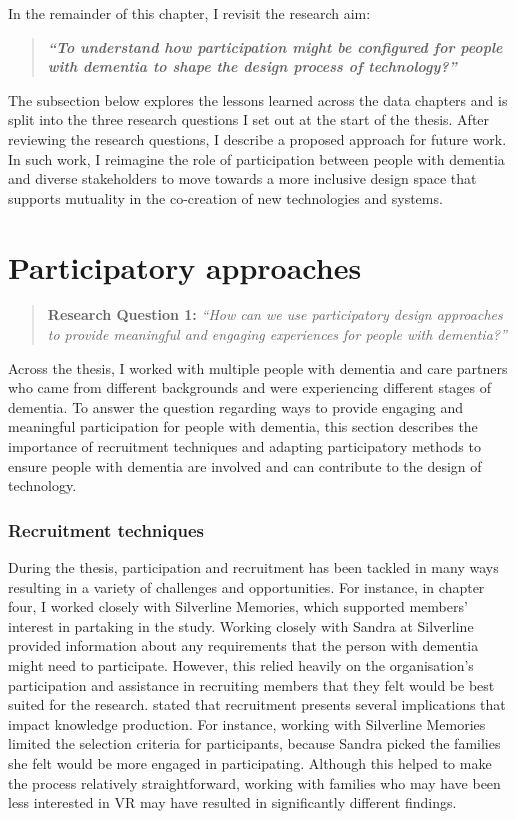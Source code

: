 In the remainder of this chapter, I revisit the research aim:
\begin{quote}
\textbf{\textit{``To understand how participation might be configured for people with dementia to shape the design process of technology?''}}
\end{quote}

The subsection below explores the lessons learned across the data chapters and is split into the three research questions I set out at the start of the thesis. After reviewing the research questions, I describe a proposed approach for future work. In such work, I reimagine the role of participation between people with dementia and diverse stakeholders to move towards a more inclusive design space that supports mutuality in the co-creation of new technologies and systems. 

\section{Participatory approaches}
\label{Discussion:RQ1}
\begin{quote}
\textbf{    Research Question 1:
}    
\textit{    “How can we use participatory design approaches to provide meaningful and engaging experiences for people with dementia?”}
\end{quote}

Across the thesis, I worked with multiple people with dementia and care partners who came from different backgrounds and were experiencing different stages of dementia. To answer the question regarding ways to provide engaging and meaningful participation for people with dementia, this section describes the importance of recruitment techniques and adapting participatory methods to ensure people with dementia are involved and can contribute to the design of technology. 

\subsubsection{Recruitment techniques}
\label{RecruitmentTechniques}
During the thesis, participation and recruitment has been tackled in many ways resulting in a variety of challenges and opportunities. For instance, in chapter four, I worked closely with Silverline Memories, which supported members' interest in partaking in the study. Working closely with Sandra at Silverline provided information about any requirements that the person with dementia might need to participate. However, this relied heavily on the organisation's participation and assistance in recruiting members that they felt would be best suited for the research. \cite{kristensen2015voices} stated that recruitment presents several implications that impact knowledge production. For instance, working with Silverline Memories limited the selection criteria for participants, because Sandra picked the families she felt would be more engaged in participating. Although this helped to make the process relatively straightforward, working with families who may have been less interested in VR may have resulted in significantly different findings.

